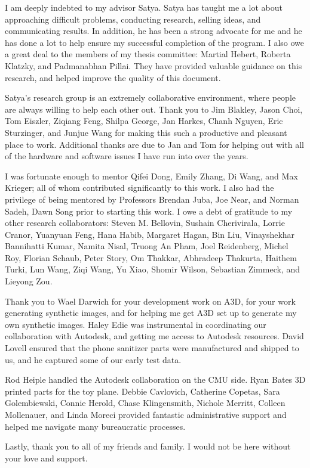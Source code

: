 \documentclass[12pt]{cmuthesis}
\begin{document}
\begin{acknowledgments}
  I am deeply indebted to my advisor Satya.
  Satya has taught me a lot about approaching difficult problems, conducting
  research, selling ideas, and communicating results.
  In addition, he has been a strong advocate for me and he has done a lot to
  help ensure my successful completion of the program.
  I also owe a great deal to the members of my thesis committee: Martial Hebert,
  Roberta Klatzky, and Padmanabhan Pillai.
  They have provided valuable guidance on this research, and helped improve the
  quality of this document.

  Satya's research group is an extremely collaborative environment, where
  people are always willing to help each other out.
  Thank you to Jim Blakley, Jason Choi, Tom Eiszler, Ziqiang Feng, Shilpa
  George, Jan Harkes, Chanh Nguyen, Eric Sturzinger, and Junjue Wang
  for making this such a productive and pleasant place to work.
  Additional thanks are due to Jan and Tom for helping out with all of the
  hardware and software issues I have run into over the years.

  I was fortunate enough to mentor Qifei Dong, Emily Zhang, Di Wang, and
  Max Krieger; all of whom contributed significantly to this work.
  I also had the privilege of being mentored by Professors Brendan Juba,
  Joe Near, and Norman Sadeh, Dawn Song prior to starting this work.
  I owe a debt of gratitude to my other research collaborators:
  Steven M. Bellovin, Sushain Cherivirala, Lorrie Cranor, Yuanyuan Feng, Hana
  Habib, Margaret Hagan, Bin Liu, Vinayshekhar Bannihatti Kumar, Namita Nisal,
  Truong An Pham, Joel Reidenberg, Michel Roy, Florian Schaub, Peter Story,
  Om Thakkar, Abhradeep Thakurta, Haithem Turki, Lun Wang, Ziqi Wang, Yu Xiao,
  Shomir Wilson, Sebastian Zimmeck, and Lieyong Zou.

  Thank you to Wael Darwich for your development work on A3D, for your work
  generating synthetic images, and for helping me get A3D set up to generate my
  own synthetic images.
  Haley Edie was instrumental in coordinating our collaboration with Autodesk,
  and getting me access to Autodesk resources.
  David Lovell ensured that the phone sanitizer parts were manufactured and
  shipped to us, and he captured some of our early test data.

  Rod Heiple handled the Autodesk collaboration on the CMU side.
  Ryan Bates 3D printed parts for the toy plane.
  Debbie Cavlovich, Catherine Copetas, Sara Golembiewski, Connie Herold,
  Chase Klingensmith, Nichole Merritt, Colleen Mollenauer, and Linda Moreci
  provided fantastic administrative support and helped me navigate many
  bureaucratic processes.

  Lastly, thank you to all of my friends and family.
  I would not be here without your love and support.
\end{acknowledgments}
\end{document}
